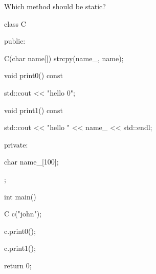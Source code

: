 Which method should be static?



\begin{consolethree}[escapeinside=||]

class C

{

public:

    C(char name[]) { strcpy(name_, name); }

    void print0() const

    {

        std::cout << "hello 0\n";

    }

    void print1() const

    {

        std::cout << "hello " << name_ << std::endl;

    }

private:

    char name_[100];

};



int main()

{

    C c("john");

    c.print0();

    c.print1();

    return 0;

}

\end{consolethree}

